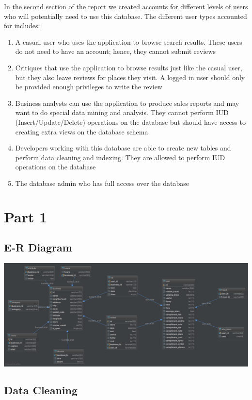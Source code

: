 \documentclass[12pt]{scrbook}
\begin{document}
In the second section of the report we created accounts for different levels of users who will
potentially need to use this database. The different user types accounted for includes:
\begin{enumerate}
  \item{A casual user who uses the application to browse search results. These users do not need
	to have an account; hence, they cannot submit reviews}
  \item{Critiques that use the application to browse results just like the casual user, but they also
	leave reviews for places they visit. A logged in user should only be provided enough privileges
	to write the review}
  \item{Business analysts can use the application to produce sales reports and may want to do
	special data mining and analysis. They cannot perform IUD (Insert/Update/Delete) operations
	on the database but should have access to creating extra views on the database
	schema}
  \item{Developers working with this database are able to create new tables and perform data
	cleaning and indexing. They are allowed to perform IUD operations on the database}
  \item{The database admin who has full access over the database}
\end{enumerate}

\section{Part 1}
\subsection{E-R Diagram}
\includegraphics[width=\textwidth]{ER_Diagram}
\subsection{Data Cleaning}
\end{document}
